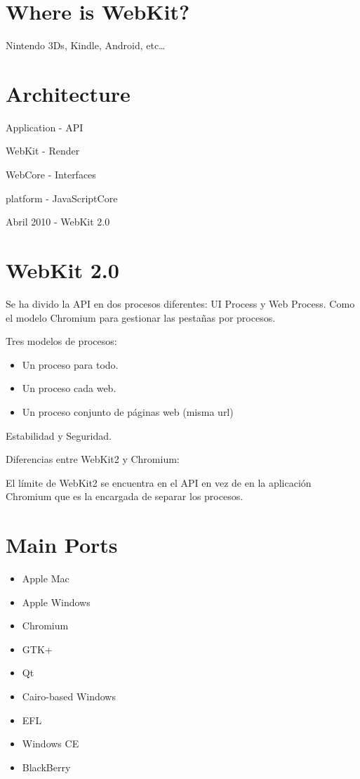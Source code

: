\documentclass[11pt]{scrartcl}
\begin{document}
\section{Where is WebKit?}
\label{sec:where-is}

Nintendo 3Ds, Kindle, Android, etc\ldots


\section{Architecture}
\label{sec:architecture}

Application - API

WebKit - Render

WebCore - Interfaces

platform - JavaScriptCore

Abril 2010 - WebKit 2.0


\section{WebKit 2.0}
\label{sec:webkit-2.0}

Se ha divido la API en dos procesos diferentes: UI Process y Web Process.
Como el modelo Chromium para gestionar las pestañas por procesos.

Tres modelos de procesos:
\begin{itemize}
	\item Un proceso para todo.
	\item Un proceso cada web.
	\item Un proceso conjunto de páginas web (misma url)
\end{itemize}

Estabilidad y Seguridad.

Diferencias entre WebKit2 y Chromium:

El límite de WebKit2 se encuentra en el API en vez de en la aplicación Chromium que es la encargada de separar los procesos.


\section{Main Ports}
\label{sec:main-ports}

\begin{itemize}
	\item Apple Mac
	\item Apple Windows
	\item Chromium
	\item GTK+
	\item Qt
	\item Cairo-based Windows
	\item EFL
	\item Windows CE
	\item BlackBerry
\end{itemize}
\end{document}
